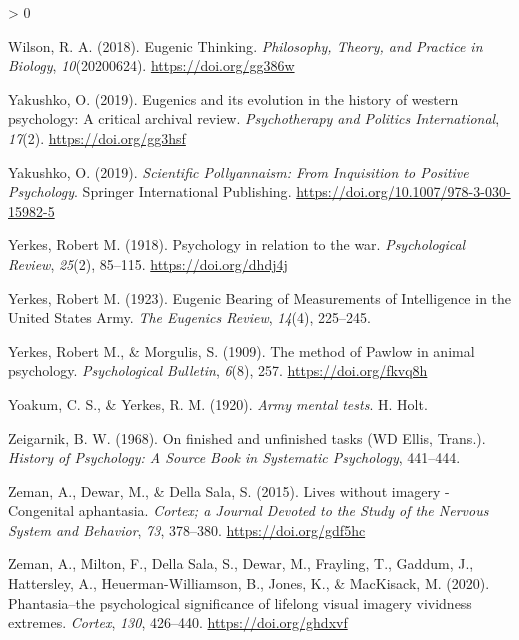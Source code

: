 \documentclass[
  oneside,
  12pt]{crumpbook}
\newlength{\cslhangindent}
\newenvironment{CSLReferences}[2] %
 {%
  \setlength{\parindent}{0pt}
  \ifodd #1 \everypar{\setlength{\hangindent}{\cslhangindent}}\ignorespaces\fi
  \ifnum #2 > 0
  \setlength{\parskip}{#2\baselineskip}
  \fi
 }%
 {}
\begin{document}
\begin{CSLReferences}{1}{0}
\leavevmode\hypertarget{ref-wilsonEugenicThinking2018}{}%
Wilson, R. A. (2018). Eugenic {Thinking}. \emph{Philosophy, Theory, and Practice in Biology}, \emph{10}(20200624). \url{https://doi.org/gg386w}

\leavevmode\hypertarget{ref-yakushkoEugenicsItsEvolution2019}{}%
Yakushko, O. (2019). Eugenics and its evolution in the history of western psychology: {A} critical archival review. \emph{Psychotherapy and Politics International}, \emph{17}(2). \url{https://doi.org/gg3hsf}

\leavevmode\hypertarget{ref-yakushkoScientificPollyannaismInquisition2019}{}%
Yakushko, O. (2019). \emph{Scientific {Pollyannaism}: {From Inquisition} to {Positive Psychology}}. {Springer International Publishing}. \url{https://doi.org/10.1007/978-3-030-15982-5}

\leavevmode\hypertarget{ref-yerkesPsychologyRelationWar1918}{}%
Yerkes, Robert M. (1918). Psychology in relation to the war. \emph{Psychological Review}, \emph{25}(2), 85--115. \url{https://doi.org/dhdj4j}

\leavevmode\hypertarget{ref-yerkesEugenicBearingMeasurements1923}{}%
Yerkes, Robert M. (1923). Eugenic {Bearing} of {Measurements} of {Intelligence} in the {United States Army}. \emph{The Eugenics Review}, \emph{14}(4), 225--245.

\leavevmode\hypertarget{ref-yerkesMethodPawlowAnimal1909}{}%
Yerkes, Robert M., \& Morgulis, S. (1909). The method of {Pawlow} in animal psychology. \emph{Psychological Bulletin}, \emph{6}(8), 257. \url{https://doi.org/fkvq8h}

\leavevmode\hypertarget{ref-yoakumArmyMentalTests1920}{}%
Yoakum, C. S., \& Yerkes, R. M. (1920). \emph{Army mental tests}. {H. Holt}.

\leavevmode\hypertarget{ref-zeigarnikFinishedUnfinishedTasks1968}{}%
Zeigarnik, B. W. (1968). On finished and unfinished tasks ({WD Ellis}, {Trans}.). \emph{History of Psychology: A Source Book in Systematic Psychology}, 441--444.

\leavevmode\hypertarget{ref-zemanLivesImageryCongenital2015}{}%
Zeman, A., Dewar, M., \& Della Sala, S. (2015). Lives without imagery - {Congenital} aphantasia. \emph{Cortex; a Journal Devoted to the Study of the Nervous System and Behavior}, \emph{73}, 378--380. \url{https://doi.org/gdf5hc}

\leavevmode\hypertarget{ref-zemanPhantasiaPsychologicalSignificance2020}{}%
Zeman, A., Milton, F., Della Sala, S., Dewar, M., Frayling, T., Gaddum, J., Hattersley, A., Heuerman-Williamson, B., Jones, K., \& MacKisack, M. (2020). Phantasia--the psychological significance of lifelong visual imagery vividness extremes. \emph{Cortex}, \emph{130}, 426--440. \url{https://doi.org/ghdxvf}


\end{CSLReferences}
\end{document}
